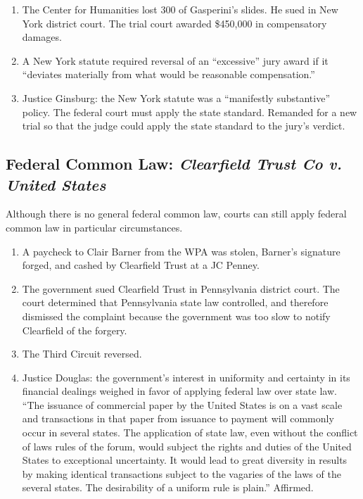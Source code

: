 \begin{enumerate}
    \item The Center for Humanities lost 300 of Gasperini's slides. He sued in 
    New York district court. The trial court awarded \$450,000 in compensatory 
    damages.
    \item A New York statute required reversal of an ``excessive'' jury award 
    if it ``deviates materially from what would be reasonable compensation.''
    \item Justice Ginsburg: the New York statute was a ``manifestly 
    substantive'' policy. The federal court must apply the state standard.  
    Remanded for a new trial so that the judge could apply the state standard 
    to the jury's verdict.
\end{enumerate}

\subsection{Federal Common Law: \emph{Clearfield Trust Co v. United States}}

Although there is no general federal common law, courts can still apply 
federal common law in particular circumstances.

\begin{enumerate}
    \item A paycheck to Clair Barner from the WPA was stolen, Barner's 
    signature forged, and cashed by Clearfield Trust at a JC Penney.
    \item The government sued Clearfield Trust in Pennsylvania district court. 
    The court determined that Pennsylvania state law controlled, and therefore 
    dismissed the complaint because the government was too slow to notify 
    Clearfield of the forgery.
    \item The Third Circuit reversed.
    \item Justice Douglas: the government's interest in uniformity and 
    certainty in its financial dealings weighed in favor of applying federal 
    law over state law. ``The issuance of commercial paper by the United 
    States is on a vast scale and transactions in that paper from issuance to 
    payment will commonly occur in several states. The application of state 
    law, even without the conflict of laws rules of the forum, would subject 
    the rights and duties of the United States to exceptional uncertainty. It 
    would lead to great diversity in results by making identical transactions 
    subject to the vagaries of the laws of the several states. The 
    desirability of a uniform rule is plain.'' Affirmed.
\end{enumerate}

